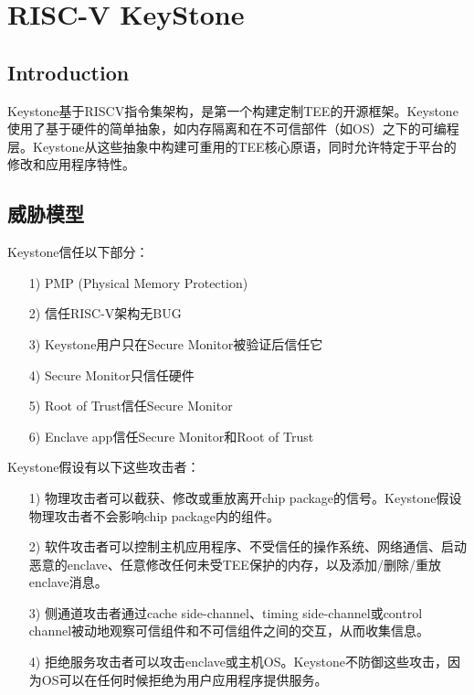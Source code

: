 
\chapter{RISC-V KeyStone} %

\label{Chapter4} %

\section{Introduction}
Keystone基于RISCV指令集架构，是第一个构建定制TEE的开源框架。Keystone使用了基于硬件的简单抽象，如内存隔离和在不可信部件（如OS）之下的可编程层。Keystone从这些抽象中构建可重用的TEE核心原语，同时允许特定于平台的修改和应用程序特性。

\section{威胁模型}
Keystone信任以下部分：
\begin{itemize}
	\item [1)]
	PMP (Physical Memory Protection)
	\item [2)]
	信任RISC-V架构无BUG
	\item [3)]
	Keystone用户只在Secure Monitor被验证后信任它
	\item [4)]
	Secure Monitor只信任硬件
	\item [5)]
	Root of Trust信任Secure Monitor
	\item [6)]
	Enclave app信任Secure Monitor和Root of Trust
\end{itemize}
Keystone假设有以下这些攻击者：
\begin{itemize}
	\item [1)]
	物理攻击者可以截获、修改或重放离开chip package的信号。Keystone假设物理攻击者不会影响chip package内的组件。
	\item [2)]
	软件攻击者可以控制主机应用程序、不受信任的操作系统、网络通信、启动恶意的enclave、任意修改任何未受TEE保护的内存，以及添加/删除/重放enclave消息。
	\item [3)]
	侧通道攻击者通过cache side-channel、timing side-channel或control channel被动地观察可信组件和不可信组件之间的交互，从而收集信息。
	\item [4)]	
	拒绝服务攻击者可以攻击enclave或主机OS。Keystone不防御这些攻击，因为OS可以在任何时候拒绝为用户应用程序提供服务。
\end{itemize}

